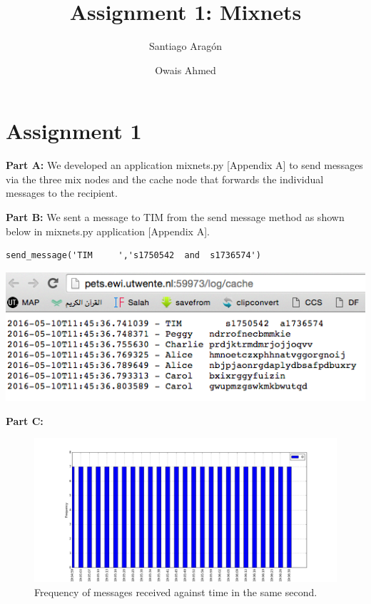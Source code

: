 \documentclass[preprint,12pt,3p]{elsarticle}
\begin{document}
\begin{frontmatter}

\title{Assignment 1: Mixnets}

\author{Santiago Aragón}
\address{s.e.aragonramirez@student.utwente.nl}

\author{Owais Ahmed}
\address{o.ahmed@student.utwente.nl}
\address{University of Twente}



\end{frontmatter}





\section*{Assignment 1}
\textbf{Part A:}
We developed an application mixnets.py [Appendix A] to send messages via the three mix nodes and the cache node that forwards the individual messages to the recipient.
\newline

\textbf{Part B:}
We sent a message to TIM from the send message method as shown below in mixnets.py application [Appendix A].
\begin{verbatim}send_message('TIM     ','s1750542  and  s1736574') \end{verbatim}

\includegraphics[width=\textwidth]{tim}

\textbf{Part C:}

\begin{figure}[h]
\caption{Frequency of messages received against time in the same second.}
\centering
\includegraphics[width=\textwidth]{one_c}
\end{figure}
\end{document}
